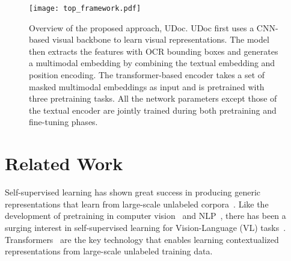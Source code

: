 \documentclass{article}
\begin{document}
	\begin{figure*}[ht!]
		\begin{center}
			\texttt{[image: top\_framework.pdf]}
		\end{center}
		\vspace{-3mm}
		\caption{Overview of the proposed {approach,} UDoc. UDoc first uses a CNN-based visual backbone to learn visual representations. The model {then} extracts the  features with OCR bounding boxes and {generates} a multimodal embedding by combining the textual embedding and position encoding. The transformer-based encoder takes a set of masked multimodal embeddings as input and is pretrained with three pretraining tasks. All the {network} parameters except {those of the} textual encoder are jointly trained {during} both pretraining and fine-tuning phases.}
		\vspace{-5mm}
		\label{fig.pretrain_arch}
	\end{figure*}
	
	\section{Related Work}
	Self-supervised learning has shown great success in producing generic {representations that learn from large-scale unlabeled corpora}~\cite{dai2019transformer}. Like the development of pretraining in computer vision~\cite{deng2009imagenet} and NLP~\cite{dai2019transformer}, there has been a surging interest in self-supervised learning for Vision-Language (VL) tasks~\cite{lu2019vilbert,su2019vl,li2019unicodervl,gu2020self}. {Transformers~\cite{dai2019transformer} are the key technology that enables learning} contextualized representations from large-scale unlabeled training data. 
	
\end{document}
